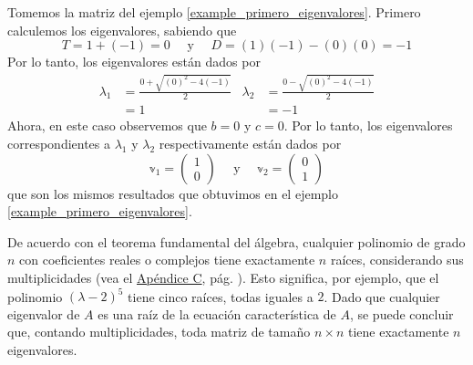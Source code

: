 \begin{example}
    Tomemos la matriz del ejemplo \ref{example_primero_eigenvalores}. Primero calculemos los eigenvalores, sabiendo que
    $$T = 1 + (-1) = 0 \quad \text{ y } \quad D = (1)(-1) - (0)(0) = - 1$$
    Por lo tanto, los eigenvalores están dados por
    \begin{align*}
        \lambda_1 & = \frac{0 + \sqrt{(0)^2 - 4(-1)}}{2} & \lambda_2 & = \frac{0 - \sqrt{(0)^2 - 4(-1)}}{2} \\
        & = 1 & & = - 1
    \end{align*}
    Ahora, en este caso observemos que $b = 0$ y $c = 0$. Por lo tanto, los eigenvalores correspondientes a $\lambda_1$ y $\lambda_2$ respectivamente están dados por
    $$\mathbb{v}_1 = \begin{pmatrix} 1 \\ 0 \end{pmatrix} \quad \text{ y } \quad \mathbb{v}_2 = \begin{pmatrix} 0 \\ 1 \end{pmatrix}$$
    que son los mismos resultados que obtuvimos en el ejemplo \ref{example_primero_eigenvalores}.
\end{example}

\begin{observation}
    De acuerdo con el teorema fundamental del álgebra, cualquier polinomio de grado $n$ con coeficientes reales o complejos tiene exactamente $n$ raíces, considerando sus multiplicidades (vea el \hyperref[FUNDAMENTAL]{Apéndice C}, pág. \pageref{CONSECUENCIA1_FUNDAMENTAL}). Esto significa, por ejemplo, que el polinomio $(\lambda - 2)^5$ tiene cinco raíces, todas iguales a $2$. Dado que cualquier eigenvalor de $A$ es una raíz de la ecuación característica de $A$, se puede concluir que, contando multiplicidades, toda matriz de tamaño $n \times n$ tiene exactamente $n$ eigenvalores.
\end{observation}

